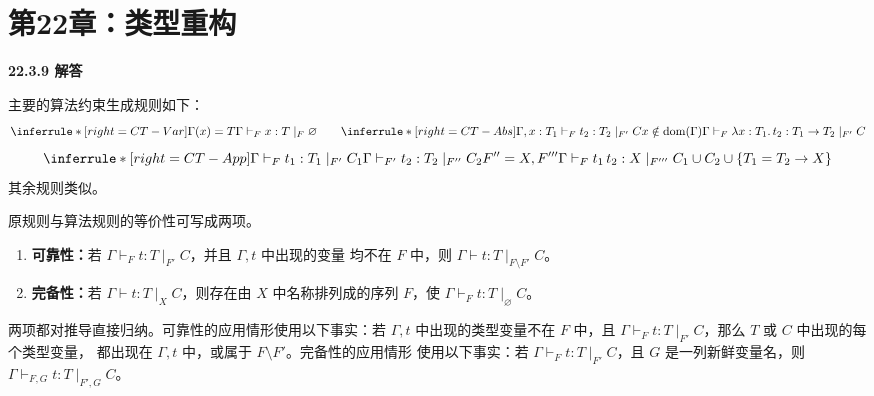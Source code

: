 \newpage
\section{第22章：类型重构}

\begin{taplauthorsolutionentrybox}
\label{sol:author:22.3.9}
\textbf{22.3.9 解答}

主要的算法约束生成规则如下：
\[
\inferrule*[right=CT-Var]
 {\Gamma(x)=T}
 {\Gamma\vdash_Fx:T\mid_F\varnothing}
\qquad
\inferrule*[right=CT-Abs]
 {\Gamma,x:T_1\vdash_Ft_2:T_2\mid_{F'}C\\
  x\notin\dom(\Gamma)}
 {\Gamma\vdash_F\lambda x:T_1.\,t_2:T_1\to T_2\mid_{F'}C}
\]
\[
\inferrule*[right=CT-App]
 {\Gamma\vdash_Ft_1:T_1\mid_{F'}C_1\\
  \Gamma\vdash_{F'}t_2:T_2\mid_{F''}C_2\\
  F''=X,F'''}
 {\Gamma\vdash_Ft_1\,t_2:X\mid_{F'''}
  C_1\cup C_2\cup\{T_1=T_2\to X\}}
\]
其余规则类似。

原规则与算法规则的等价性可写成两项。
\begin{enumerate}
  \item \textbf{可靠性：}若
        \(\Gamma\vdash_Ft:T\mid_{F'}C\)，并且 \(\Gamma,t\) 中出现的变量
        均不在 \(F\) 中，则
        \(\Gamma\vdash t:T\mid_{F\setminus F'}C\)。
  \item \textbf{完备性：}若
        \(\Gamma\vdash t:T\mid_XC\)，则存在由 \(X\) 中名称排列成的序列
        \(F\)，使 \(\Gamma\vdash_Ft:T\mid_{\varnothing}C\)。
\end{enumerate}
两项都对推导直接归纳。可靠性的应用情形使用以下事实：若
\(\Gamma,t\) 中出现的类型变量不在 \(F\) 中，且
\(\Gamma\vdash_Ft:T\mid_{F'}C\)，那么 \(T\) 或 \(C\) 中出现的每个类型变量，
都出现在 \(\Gamma,t\) 中，或属于 \(F\setminus F'\)。完备性的应用情形
使用以下事实：若
\(\Gamma\vdash_Ft:T\mid_{F'}C\)，且 \(G\) 是一列新鲜变量名，则
\(\Gamma\vdash_{F,G}t:T\mid_{F',G}C\)。

\end{taplauthorsolutionentrybox}

